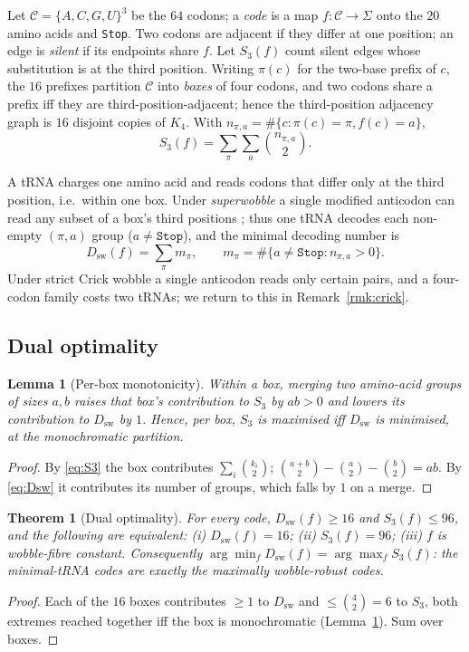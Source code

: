 \documentclass[11pt]{article}
\newtheorem{theorem}{Theorem}
\newtheorem{lemma}{Lemma}
\theoremstyle{remark}
\newcommand{\Dsw}{D_{\mathrm{sw}}}
\newcommand{\Sthree}{S_3}
\begin{document}
Let $\mathcal{C}=\{A,C,G,U\}^3$ be the $64$ codons; a \emph{code} is a map
$f\colon\mathcal{C}\to\Sigma$ onto the $20$ amino acids and \texttt{Stop}. Two
codons are adjacent if they differ at one position; an edge is \emph{silent} if
its endpoints share $f$. Let $\Sthree(f)$ count silent edges whose substitution
is at the third position. Writing $\pi(c)$ for the two-base prefix of $c$, the
$16$ prefixes partition $\mathcal{C}$ into \emph{boxes} of four codons, and two
codons share a prefix iff they are third-position-adjacent; hence the
third-position adjacency graph is $16$ disjoint copies of $K_4$. With
$n_{\pi,a}=\#\{c:\pi(c)=\pi,f(c)=a\}$,
\begin{equation}\label{eq:S3}
  \Sthree(f)=\sum_{\pi}\sum_{a}\binom{n_{\pi,a}}{2}.
\end{equation}

A tRNA charges one amino acid and reads codons that differ only at the third
position, i.e.\ within one box. Under \emph{superwobble} a single modified
anticodon can read any subset of a box's third positions \cite{agris,grosjean};
thus one tRNA decodes each non-empty $(\pi,a)$ group ($a\neq\texttt{Stop}$), and
the minimal decoding number is
\begin{equation}\label{eq:Dsw}
  \Dsw(f)=\sum_{\pi} m_\pi,\qquad m_\pi=\#\{a\neq\texttt{Stop}:n_{\pi,a}>0\}.
\end{equation}
Under strict Crick wobble a single anticodon reads only certain pairs, and a
four-codon family costs two tRNAs; we return to this in
Remark~\ref{rmk:crick}.

\subsection{Dual optimality}

\begin{lemma}[Per-box monotonicity]\label{lem:box}
Within a box, merging two amino-acid groups of sizes $a,b$ raises that box's
contribution to $\Sthree$ by $ab>0$ and lowers its contribution to $\Dsw$ by
$1$. Hence, per box, $\Sthree$ is maximised iff $\Dsw$ is minimised, at the
monochromatic partition.
\end{lemma}
\begin{proof}
By \eqref{eq:S3} the box contributes $\sum_i\binom{k_i}{2}$;
$\binom{a+b}{2}-\binom{a}{2}-\binom{b}{2}=ab$. By \eqref{eq:Dsw} it contributes
its number of groups, which falls by $1$ on a merge.
\end{proof}

\begin{theorem}[Dual optimality]\label{thm:dual}
For every code, $\Dsw(f)\ge16$ and $\Sthree(f)\le96$, and the following are
equivalent: \emph{(i)} $\Dsw(f)=16$; \emph{(ii)} $\Sthree(f)=96$; \emph{(iii)}
$f$ is wobble-fibre constant. Consequently
$\arg\min_f\Dsw(f)=\arg\max_f\Sthree(f)$: the minimal-tRNA codes are exactly the
maximally wobble-robust codes.
\end{theorem}
\begin{proof}
Each of the $16$ boxes contributes $\ge1$ to $\Dsw$ and $\le\binom{4}{2}=6$ to
$\Sthree$, both extremes reached together iff the box is monochromatic
(Lemma~\ref{lem:box}). Sum over boxes.
\end{proof}
\end{document}
